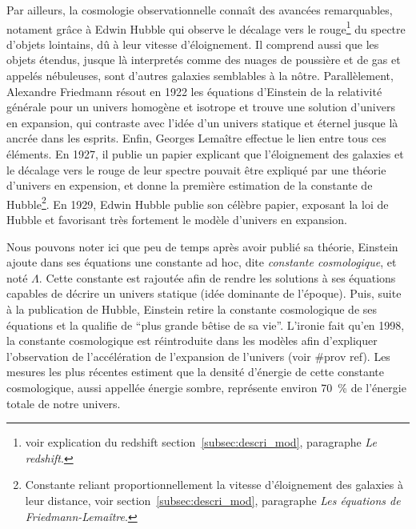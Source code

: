 \documentclass[11pt, twoside, a4paper, openright]{report}
\begin{document}
Par ailleurs, la cosmologie observationnelle connaît des avancées remarquables, notament grâce à Edwin Hubble qui observe le décalage vers le rouge\footnote{voir explication du redshift section~\ref{subsec:descri_mod}, paragraphe \emph{Le redshift}.} du spectre d'objets lointains, dû à leur vitesse d'éloignement. Il comprend aussi que les objets étendus, jusque là interpretés comme des nuages de poussière et de gas et appelés nébuleuses, sont d'autres galaxies semblables à la nôtre. Parallèlement, Alexandre Friedmann résout en 1922 les équations d'Einstein de la relativité générale pour un univers homogène et isotrope et trouve une solution d'univers en expansion, qui contraste avec l'idée d'un univers statique et éternel jusque là ancrée dans les esprits. Enfin, Georges Lemaître effectue le lien entre tous ces éléments. En 1927, il publie un papier explicant que l'éloignement des galaxies et le décalage vers le rouge de leur spectre pouvait être expliqué par une théorie d'univers en expension, et donne la première estimation de la constante de Hubble\footnote{Constante reliant proportionnellement la vitesse d'éloignement des galaxies à leur distance, voir section~\ref{subsec:descri_mod}, paragraphe \emph{Les équations de Friedmann-Lemaître}.}. En 1929, Edwin Hubble publie son célèbre papier, exposant la loi de Hubble et favorisant très fortement le modèle d'univers en expansion.

Nous pouvons noter ici que peu de temps après avoir publié sa théorie, Einstein ajoute dans ses équations une constante ad hoc, dite \emph{constante cosmologique}, et noté $\Lambda$. Cette constante est rajoutée afin de rendre les solutions à ses équations capables de décrire un univers statique (idée dominante de l'époque). Puis, suite à la publication de Hubble, Einstein retire la constante cosmologique de ses équations et la qualifie de ``plus grande bêtise de sa vie''. L'ironie fait qu'en 1998, la constante cosmologique est réintroduite dans les modèles afin d'expliquer l'observation de l'accélération de l'expansion de l'univers (voir \#prov ref). Les mesures les plus récentes estiment que la densité d'énergie de cette constante cosmologique, aussi appellée énergie sombre, représente environ \SI{70}{\percent} de l'énergie totale de notre univers.
\end{document}
